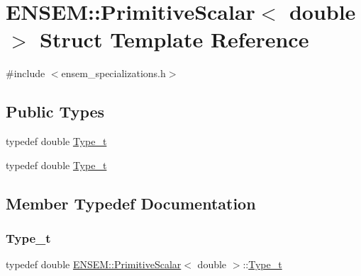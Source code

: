 \hypertarget{structENSEM_1_1PrimitiveScalar_3_01double_01_4}{}\section{E\+N\+S\+EM\+:\+:Primitive\+Scalar$<$ double $>$ Struct Template Reference}
\label{structENSEM_1_1PrimitiveScalar_3_01double_01_4}


{\ttfamily \#include $<$ensem\+\_\+specializations.\+h$>$}

\subsection*{Public Types}
\begin{DoxyCompactItemize}
\item 
typedef double \mbox{\hyperlink{structENSEM_1_1PrimitiveScalar_3_01double_01_4_aa2e1f2e6e01268fb7f088e4f05c58a7f}{Type\+\_\+t}}
\item 
typedef double \mbox{\hyperlink{structENSEM_1_1PrimitiveScalar_3_01double_01_4_aa2e1f2e6e01268fb7f088e4f05c58a7f}{Type\+\_\+t}}
\end{DoxyCompactItemize}


\subsection{Member Typedef Documentation}
\mbox{\label{structENSEM_1_1PrimitiveScalar_3_01double_01_4_aa2e1f2e6e01268fb7f088e4f05c58a7f}} 
\subsubsection{\texorpdfstring{Type\_t}{Type\_t}\hspace{0.1cm}{\footnotesize\ttfamily [1/2]}}
{\footnotesize\ttfamily typedef double \mbox{\hyperlink{structENSEM_1_1PrimitiveScalar}{E\+N\+S\+E\+M\+::\+Primitive\+Scalar}}$<$ double $>$\+::\mbox{\hyperlink{structENSEM_1_1PrimitiveScalar_3_01double_01_4_aa2e1f2e6e01268fb7f088e4f05c58a7f}{Type\+\_\+t}}}

\mbox{\label{structENSEM_1_1PrimitiveScalar_3_01double_01_4_aa2e1f2e6e01268fb7f088e4f05c58a7f}} 
